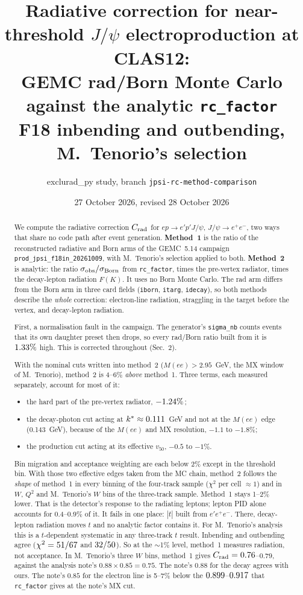 \documentclass[11pt]{article}
\title{Radiative correction for near-threshold $J/\psi$ electroproduction at CLAS12:\\
GEMC rad/Born Monte Carlo against the analytic \texttt{rc\_factor}\\[4pt]
\large F18 inbending and outbending, M.~Tenorio's selection}
\author{exclurad\_py study, branch \texttt{jpsi-rc-method-comparison}}
\date{27 October 2026, revised 28 October 2026}
\newcommand{\crad}{C_{\rm rad}}
\begin{document}
\maketitle

\begin{abstract}
We compute the radiative correction $\crad$ for $ep\to e'p'J/\psi$, $J/\psi\to e^+e^-$, two ways that share
no code path after event generation.
\textbf{Method~1} is the ratio of the reconstructed radiative and Born arms of the GEMC~5.14 campaign
\texttt{prod\_jpsi\_f18in\_20261009}, with M.~Tenorio's selection applied to both.
\textbf{Method~2} is analytic: the ratio $\sigma_{\rm obs}/\sigma_{\rm Born}$ from \texttt{rc\_factor}, times the
pre-vertex radiator, times the decay-lepton radiation $F(K)$. It uses no Born Monte Carlo.
The rad arm differs from the Born arm in three card fields (\texttt{iborn}, \texttt{itarg}, \texttt{idecay}), so
both methods describe the \emph{whole} correction: electron-line radiation, straggling in the target before the vertex,
and decay-lepton radiation.

First, a normalisation fault in the campaign. The generator's \texttt{sigma\_nb} counts events that its own daughter
preset then drops, so every rad/Born ratio built from it is $1.33\%$ high. This is corrected throughout (Sec.~2).

With the nominal cuts written into method~2 ($M(ee)>2.95$~GeV, the MX window of M.~Tenorio), method~2 is 4--6\% \emph{above}
method~1. Three terms, each measured separately, account for most of it:
\begin{itemize}
\item the hard part of the pre-vertex radiator, $-1.24\%$;
\item the decay-photon cut acting at $k^*\approx0.111$~GeV and not at the $M(ee)$ edge (0.143~GeV), because of the
$M(ee)$ and MX resolution, $-1.1$ to $-1.8\%$;
\item the production cut acting at its effective $v_{50}$, $-0.5$ to $-1\%$.
\end{itemize}
Bin migration and acceptance weighting are each below 2\% except in the threshold bin.
With those two effective edges taken from the MC chain, method~2 follows the \emph{shape} of method~1 in every binning of
the four-track sample ($\chi^2$ per cell $\approx1$) and in $W$, $Q^2$ and M.~Tenorio's $W$ bins of the three-track sample.
Method~1 stays 1--2\% lower. That is the detector's response to the radiating leptons; lepton PID alone accounts for
0.4--0.9\% of it.
It fails in one place: $|t|$ built from $e'e^+e^-$. There, decay-lepton radiation moves $t$ and no analytic factor
contains it. For M.~Tenorio's analysis this is a $t$-dependent systematic in any three-track $t$ result.
Inbending and outbending agree ($\chi^2=51/67$ and $32/50$). So at the
$\sim$1\% level, method~1 measures radiation, not acceptance.
In M.~Tenorio's three $W$ bins, method~1 gives $\crad=0.76$--$0.79$, against the analysis note's $0.88\times0.85=0.75$. The note's $0.88$ for the decay agrees with ours.
The note's $0.85$ for the electron line is 5--7\% below the $0.899$--$0.917$ that \texttt{rc\_factor} gives at the note's MX cut.
\end{abstract}
\end{document}
